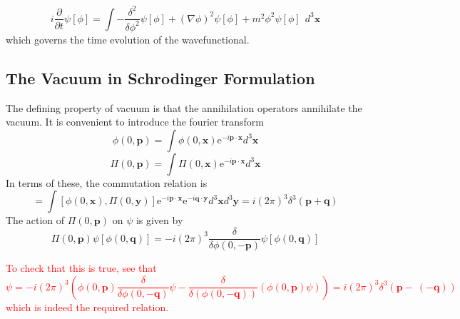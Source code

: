 \documentclass[11pt, notitlepage]{report}
\newcommand{\del}{\partial}
\newcommand{\e}{\mathrm{e}}
\numberwithin{equation}{section}
\begin{document}
    \begin{equation}
        i\frac{\del}{\del t}\psi[\phi] = \int -\frac{\delta^2}{\delta \phi^2} \psi[\phi] + (\nabla \phi)^2\psi[\phi]+ m^2\phi^2\psi[\phi]  ~~d^3\textbf{x}
    \end{equation}
    which governs the time evolution of the wavefunctional.

    \subsection{The Vacuum in Schrodinger Formulation}
    The defining property of vacuum is that the annihilation operators annihilate the vacuum. 
    It is convenient to introduce the fourier transform 
    \begin{equation}
        \phi(0, \textbf{p}) = \int \phi(0, \textbf{x}) \e^{-i\textbf{p}\cdot \textbf{x}}d^3\textbf{x}
    \end{equation}
    \begin{equation}
        \Pi(0, \textbf{p}) = \int \Pi(0, \textbf{x}) \e^{-i\textbf{p}\cdot \textbf{x}}d^3\textbf{x}
    \end{equation}
    In terms of these, the commutation relation is 
    \begin{equation}
        [\phi(0, \textbf{p}), \Pi(0, \textbf{q})] = \int [\phi(0, \textbf{x}), \Pi(0, \textbf{y})]\e^{-i\textbf{p}\cdot\textbf{x}}\e^{-i\textbf{q}\cdot \textbf{y}} d^3\textbf{x}d^3\textbf{y} = i(2\pi)^3\delta^3(\textbf{p}+\textbf{q})
    \end{equation}
    The action of \(\Pi(0, \textbf{p})\) on \(\psi\) is given by 
    \begin{equation}
        \Pi(0, \textbf{p})\psi[\phi(0, \textbf{q})] = -i(2\pi)^3\frac{\delta}{\delta \phi(0, -\textbf{p})}\psi[\phi(0, \textbf{q})]
    \end{equation}

    \textcolor{red}{
        To check that this is true, see that
        \begin{equation}
            [\psi(0, \textbf{p}), \Pi(0, \textbf{q})]\psi = -i(2\pi)^3 \left( \phi(0, \textbf{p}) \frac{\delta}{\delta \phi(0,-\textbf{q})}\psi - \frac{\delta}{\delta(\phi(0, -\textbf{q}))} (\phi(0, \textbf{p})\psi)\right) = i(2\pi)^3\delta^3(\textbf{p}-~(-\textbf{q}))
        \end{equation}
        which is indeed the required relation.\\
    }
\end{document}
